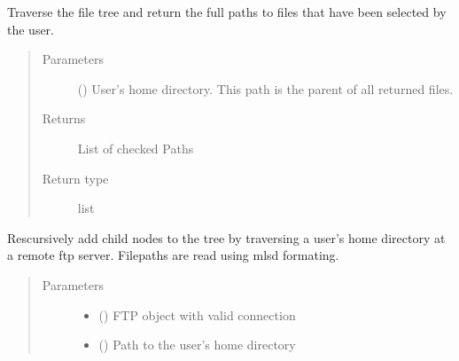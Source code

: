 \documentclass[letterpaper,10pt,english]{sphinxmanual}
\begin{document}
\begin{fulllineitems}
\begin{fulllineitems}
\label{\detokenize{polo.widgets:polo.widgets.file_browser.fileBrowser.get_checked_files}}
Traverse the file tree and return the full paths to files that have
been selected by the user.
\begin{quote}\begin{description}
\item[{Parameters}] \leavevmode
{} () \textendash{} User’s home directory. This path is the parent of all
returned files.

\item[{Returns}] \leavevmode
List of checked Paths

\item[{Return type}] \leavevmode
list

\end{description}\end{quote}

\end{fulllineitems}


\begin{fulllineitems}
\label{\detokenize{polo.widgets:polo.widgets.file_browser.fileBrowser.grow_tree_using_mlsd}}
Rescursively add child nodes to the tree by traversing
a user’s home directory at a remote ftp server. Filepaths
are read using mlsd formating.
\begin{quote}\begin{description}
\item[{Parameters}] \leavevmode\begin{itemize}
\item {} 
 () \textendash{} FTP object with valid connection

\item {} 
 () \textendash{} Path to the user’s home directory


\end{itemize}
\end{description}
\end{quote}
\end{fulllineitems}
\end{fulllineitems}
\end{document}
